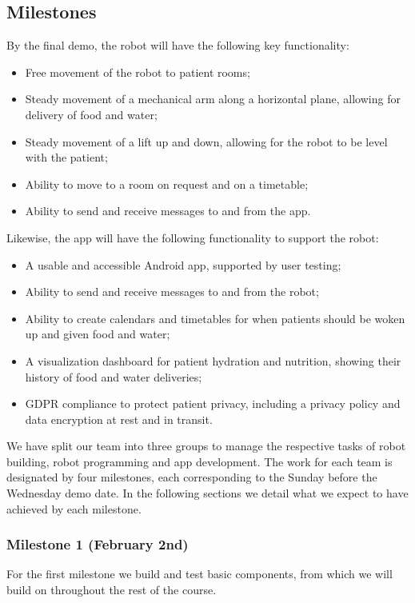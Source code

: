 \documentclass{article}
\begin{document}
\subsection{Milestones}
By the final demo, the robot will have the following key functionality:
\begin{itemize}
\item Free movement of the robot to patient rooms;
\item Steady movement of a mechanical arm along a horizontal plane, allowing for delivery of food and water;
\item Steady movement of a lift up and down, allowing for the robot to be level with the patient;
\item Ability to move to a room on request and on a timetable;
\item Ability to send and receive messages to and from the app. 
\end{itemize}

Likewise, the app will have the following functionality to support the robot:
\begin{itemize}
\item A usable and accessible Android app, supported by user testing;
\item Ability to send and receive messages to and from the robot;
\item Ability to create calendars and timetables for when patients should be woken up and given food and water;
\item A visualization dashboard for patient hydration and nutrition, showing their history of food and water deliveries;
\item GDPR compliance to protect patient privacy, including a privacy policy and data encryption at rest and in transit. 
\end{itemize}

We have split our team into three groups to manage the respective tasks of robot building, robot programming and app development. The work for each team is designated by four milestones, each corresponding to the Sunday before the Wednesday demo date. In the following sections we detail what we expect to have achieved by each milestone. 

\subsubsection{Milestone 1 (February 2nd)}
For the first milestone we build and test basic components, from which we will build on throughout the rest of the course. 
\end{document}
